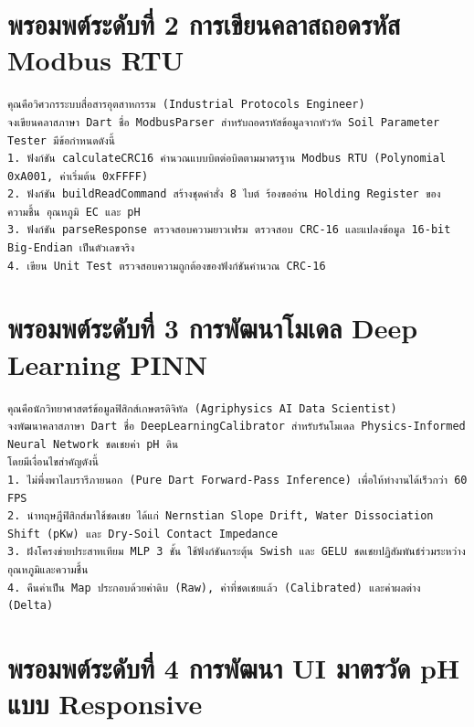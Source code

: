 \section{พรอมพต์ระดับที่ 2 การเขียนคลาสถอดรหัส Modbus RTU}

\begin{promptbox}
\begin{lstlisting}
คุณคือวิศวกรระบบสื่อสารอุตสาหกรรม (Industrial Protocols Engineer)
จงเขียนคลาสภาษา Dart ชื่อ ModbusParser สำหรับถอดรหัสข้อมูลจากหัววัด Soil Parameter Tester มีข้อกำหนดดังนี้
1. ฟังก์ชัน calculateCRC16 คำนวณแบบบิตต่อบิตตามมาตรฐาน Modbus RTU (Polynomial 0xA001, ค่าเริ่มต้น 0xFFFF)
2. ฟังก์ชัน buildReadCommand สร้างชุดคำสั่ง 8 ไบต์ ร้องขออ่าน Holding Register ของความชื้น อุณหภูมิ EC และ pH
3. ฟังก์ชัน parseResponse ตรวจสอบความยาวเฟรม ตรวจสอบ CRC-16 และแปลงข้อมูล 16-bit Big-Endian เป็นตัวเลขจริง
4. เขียน Unit Test ตรวจสอบความถูกต้องของฟังก์ชันคำนวณ CRC-16
\end{lstlisting}
\end{promptbox}

\section{พรอมพต์ระดับที่ 3 การพัฒนาโมเดล Deep Learning PINN}

\begin{promptbox}
\begin{lstlisting}
คุณคือนักวิทยาศาสตร์ข้อมูลฟิสิกส์เกษตรดิจิทัล (Agriphysics AI Data Scientist)
จงพัฒนาคลาสภาษา Dart ชื่อ DeepLearningCalibrator สำหรับรันโมเดล Physics-Informed Neural Network ชดเชยค่า pH ดิน
โดยมีเงื่อนไขสำคัญดังนี้
1. ไม่พึ่งพาไลบรารีภายนอก (Pure Dart Forward-Pass Inference) เพื่อให้ทำงานได้เร็วกว่า 60 FPS
2. นำทฤษฎีฟิสิกส์มาใช้ชดเชย ได้แก่ Nernstian Slope Drift, Water Dissociation Shift (pKw) และ Dry-Soil Contact Impedance
3. ฝังโครงข่ายประสาทเทียม MLP 3 ชั้น ใช้ฟังก์ชันกระตุ้น Swish และ GELU ชดเชยปฏิสัมพันธ์ร่วมระหว่างอุณหภูมิและความชื้น
4. คืนค่าเป็น Map ประกอบด้วยค่าดิบ (Raw), ค่าที่ชดเชยแล้ว (Calibrated) และค่าผลต่าง (Delta)
\end{lstlisting}
\end{promptbox}

\section{พรอมพต์ระดับที่ 4 การพัฒนา UI มาตรวัด pH แบบ Responsive}

